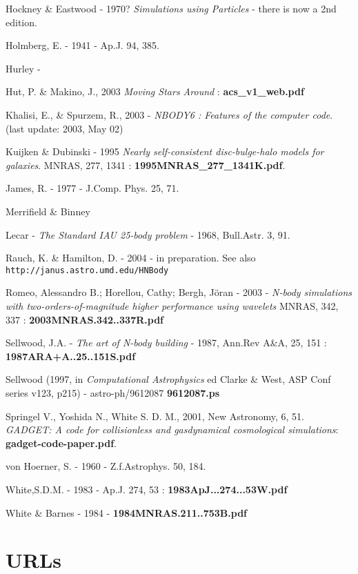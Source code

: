 Hockney \& Eastwood - 1970? {\it Simulations using Particles} - there is now a 2nd edition.

Holmberg, E. - 1941 - Ap.J. 94, 385.

Hurley - 

Hut, P. \& Makino, J., 2003  {\it Moving Stars Around} :
{\bf acs\_v1\_web.pdf}

Khalisi, E., \& Spurzem, R., 2003 - {\it NBODY6 : Features of the computer code}.
(last update: 2003, May 02)

Kuijken \& Dubinski - 1995 {\it Nearly self-consistent disc-bulge-halo models for galaxies}.
MNRAS, 277, 1341 : {\bf 1995MNRAS\_277\_1341K.pdf}.

James, R. - 1977 -  J.Comp. Phys. 25, 71.

Merrifield \& Binney

Lecar - {\it The Standard IAU 25-body problem} - 1968, Bull.Astr. 3, 91. 

Rauch, K. \& Hamilton, D. - 2004 - in preparation. See also
{\tt http://janus.astro.umd.edu/HNBody}


Romeo, Alessandro B.; Horellou, Cathy; Bergh, Jöran - 2003 - 
{\it N-body simulations with two-orders-of-magnitude higher performance using wavelets}
MNRAS, 342, 337 : {\bf 2003MNRAS.342..337R.pdf}

Sellwood, J.A. - {\it The art of N-body building} - 1987, Ann.Rev A\&A, 25, 151 : 
{\bf 1987ARA+A..25..151S.pdf}


Sellwood (1997, in {\it Computational Astrophysics} 
ed Clarke \& West,  ASP  Conf  series  v123, p215) - astro-ph/9612087
{\bf 9612087.ps}

Springel V., Yoshida N., White S. D. M., 2001, New Astronomy, 6, 51. 
{\it GADGET: A code for collisionless and gasdynamical cosmological simulations}:
{\bf gadget-code-paper.pdf}.

von Hoerner, S. - 1960 - Z.f.Astrophys. 50, 184.



White,S.D.M. - 1983 - Ap.J. 274, 53 : {\bf 1983ApJ...274...53W.pdf}

White \& Barnes - 1984 - {\bf 1984MNRAS.211..753B.pdf}

\section*{URLs}

